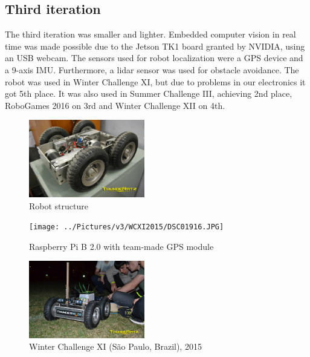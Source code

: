 \documentclass[conference]{IEEEtran}
\begin{document}
\subsection{Third iteration}
The third iteration was smaller and lighter. Embedded computer vision in real time was made
possible due to the Jetson TK1 board granted by NVIDIA, using an USB webcam. The sensors used
for robot localization were a GPS device and a 9-axis IMU. Furthermore, a lidar sensor was
used for obstacle avoidance.
The robot was used in Winter Challenge XI, but due to problems in our electronics
it got 5th place. It was also used in Summer Challenge III, achieving 2nd place, RoboGames
2016 on 3rd and Winter Challenge XII on 4th.

\begin{figure}[H]
    \centering
    \includegraphics[width=0.45\textwidth]{../Pictures/v3/WCXI2015/1404454_850450764990318_6911866873946202760_o.jpg}
    \caption{Robot structure}
\end{figure}

\begin{figure}[H]
    \centering
    \texttt{[image: ../Pictures/v3/WCXI2015/DSC01916.JPG]}
    \caption{Raspberry Pi B 2.0 with team-made GPS module}
\end{figure}

\begin{figure}[H]
    \centering
    \includegraphics[width=0.45\textwidth]{../Pictures/v3/WCXI2015/11402892_850967411605320_3887305866160117339_o.jpg}
    \caption{Winter Challenge XI (São Paulo, Brazil), 2015}
\end{figure}

\end{document}
